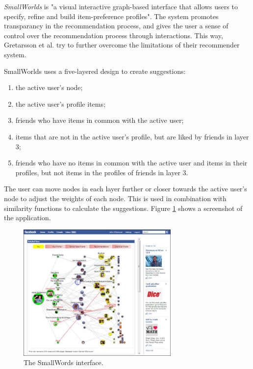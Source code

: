 \emph{SmallWorlds} is "a visual interactive graph-based interface that allows users to specify, refine and build item-preference profiles"\cite{gretarsson:2010}. The system promotes transparancy in the recommendation process, and gives the user a sense of control over the recommendation process through interactions. This way, Gretarsson et al. try to further overcome the limitations of their recommender system\cite{gretarsson:2010}.

SmallWorlds uses a five-layered design to create suggestions:

\begin{enumerate}
	\item the active user's node;
	\item the active user's profile items;
	\item friends who have items in common with the active user;
	\item items that are not in the active user’s profile, but are liked by friends in layer $3$;
	\item friends who have no items in common with the active user and items in their profiles, but not items in the profiles of friends in layer $3$.
\end{enumerate}

The user can move nodes in each layer further or closer towards the active user's node to adjust the weights of each node. This is used in combination with similarity functions to calculate the suggestions. Figure \ref{figure:smallworlds} shows a screenshot of the application.

\begin{figure}%
	\begin{center}
		\includegraphics[width=300px]{img/smallworlds}%
	\end{center}
	\caption{The SmallWords interface.}%
	\label{figure:smallworlds}%
\end{figure}


